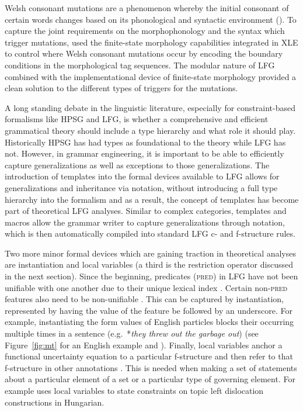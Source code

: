 \documentclass[output=paper,hidelinks]{langscibook}
\begin{document}
 Welsh consonant mutations are a phenomenon whereby the initial consonant of certain words changes based on  its phonological and syntactic environment (). To capture the joint requirements on the mor\-pho\-phon\-o\-logy and the syntax which trigger mutations, \cite{mittendorfsadler06} used the finite-state morphology capabilities integrated in XLE to control where Welsh consonant mutations occur by encoding the boundary conditions in the morphological tag sequences. The modular nature of LFG combined with the implementational device of finite-state morphology provided a clean solution to the different types of triggers for the mutations.
 
 A long standing debate in the linguistic literature, especially for constraint-based formalisms like HPSG and LFG, is whether a comprehensive and efficient grammatical theory should include a type hierarchy and what role it should play. Historically HPSG has had types as foundational to the theory  while LFG has not. However, in grammar engineering, it is important to be able to efficiently capture generalizations as well as exceptions to those generalizations. The introduction of templates into the formal devices available to LFG allows for generalizations and inheritance via notation, without introducing a full type hierarchy into the formalism \citep{dalrymple2004linguistic,crouchking08} and as a result, the concept of templates has become part of theoretical LFG analyses. Similar to complex categories, templates and macros allow the grammar writer to capture generalizations through notation, which is then automatically compiled into standard LFG c- and f-structure rules.
 
 Two more minor formal devices which are gaining traction in  theoretical analyses are instantiation and local variables (a third is the restriction operator discussed in the next section). Since the beginning, predicates (\textsc{pred}) in LFG have not been unifiable with one another due to their unique lexical index \citep{kaplanbresnan82}. Certain non-\textsc{pred} features also need to be non-unifiable \citep{dalrymple01}. This can be captured by instantiation, represented by having the value of the feature be followed by an underscore. For example, instantiating the form values of English particles blocks their occurring multiple times in a sentence (e.g.\ *{\em they threw out the garbage out}) (see Figure~\ref{fig:mt} for an English example and \cite{forstetal10}).  Finally, local variables anchor a functional uncertainty equation to a particular f-structure and then refer to that f-structure in other annotations \citep{dalrymple01,xledoc}. This is needed when making a set of statements about a particular element of a set or a particular type of governing element. For example \cite{Szucs2019} uses local variables to state constraints on topic left dislocation constructions in Hungarian.
   
\end{document}
